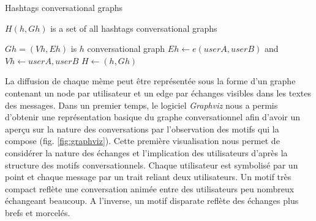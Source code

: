 \begin{algorithm}[htbp]
    \caption{Hashtags conversational graphs}
    \label{algo:hashtags-graph}
    \begin{algorithmic}
        \State $H(h,Gh)$ is a set of all hashtags conversational graphs


                    \State $Gh=(Vh,Eh)$ is $h$ conversational graph
                        \State $Eh \gets e(userA,userB)$ and $Vh \gets userA,userB $
                    \EndIf
                    \State $H \gets (h,Gh)$ 
                \EndIf
            \EndFor
        \EndFunction
    \end{algorithmic}
\end{algorithm}

La diffusion de chaque mème peut être représentée sous la forme d{\textquoteright}un graphe contenant un node par utilisateur et un edge par échanges visibles dans les textes des messages. Dans un premier temps, le logiciel \textit{Graphviz} nous a permis d{\textquoteright}obtenir une représentation basique du graphe conversationnel afin d{\textquoteright}avoir un aper\c{c}u sur la nature des conversations par l{\textquoteright}observation des motifs qui la compose (fig. \ref{fig:graphviz}). Cette première visualisation nous permet de considérer la nature des échanges et l{\textquoteright}implication des utilisateurs d{\textquoteright}après la structure des motifs conversationnels. Chaque utilisateur est symbolisé par un point et chaque message par un trait reliant deux utilisateurs. Un motif très compact reflète une conversation animée entre des utilisateurs peu nombreux échangeant beaucoup. A l{\textquoteright}inverse, un motif disparate reflète des échanges plus brefs et morcelés.

